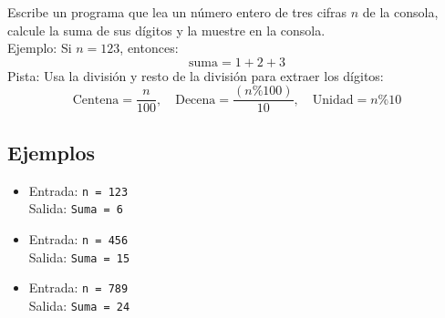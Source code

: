 Escribe un programa que lea un número entero de tres cifras \(n\) de la consola, calcule la suma de sus dígitos y la muestre en la consola.\\
Ejemplo: Si \(n = 123\), entonces:
\[
\text{suma} = 1 + 2 + 3
\]
Pista: Usa la división y resto de la división para extraer los dígitos:
\[
\text{Centena} = \frac{n}{100}, \quad \text{Decena} = \frac{(n \% 100)}{10}, \quad \text{Unidad} = n \% 10
\]
\subsection*{Ejemplos}
\begin{itemize}
    \item Entrada: \texttt{n = 123}\\
          Salida: \texttt{Suma = 6}
    \item Entrada: \texttt{n = 456}\\
          Salida: \texttt{Suma = 15}
    \item Entrada: \texttt{n = 789}\\
          Salida: \texttt{Suma = 24}
\end{itemize}